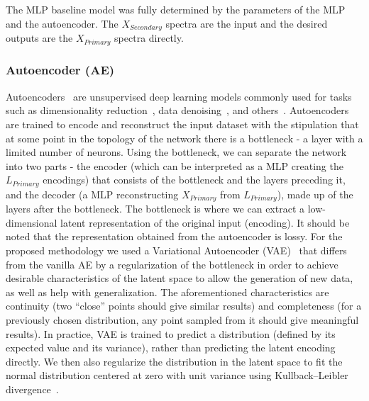 \documentclass[preprint,11pt]{elsarticle}
\begin{document}
The MLP baseline model was fully determined by the parameters of the MLP and the autoencoder. The $X_{Secondary}$ spectra are the input and the desired outputs are the $X_{Primary}$ spectra directly.



\subsubsection{Autoencoder (AE)}
\label{sec:ae}
\noindent
Autoencoders~\cite{kramer1991nonlinear} are unsupervised deep learning models commonly used for tasks such as dimensionality reduction~\cite{wang2014generalized}, data denoising~\cite{vincent2008extracting}, and others~\cite{bank2020autoencoders}. Autoencoders are trained to encode and reconstruct the input dataset with the stipulation that at some point in the topology of the network there is a bottleneck - a layer with a limited number of neurons. Using the bottleneck, we can separate the network into two parts - the encoder (which can be interpreted as a MLP creating the $L_{Primary}$ encodings) that consists of the bottleneck and the layers preceding it, and the decoder (a MLP reconstructing $X_{Primary}$ from ${L}_{Primary}$), made up of the layers after the bottleneck. The bottleneck is where we can extract a low-dimensional latent representation of the original input (encoding). It should be noted that the representation obtained from the autoencoder is lossy. For the proposed methodology we used a Variational Autoencoder (VAE)~\cite{VAE_welling} that differs from the vanilla AE by a regularization of the bottleneck in order to achieve desirable characteristics of the latent space to allow the generation of new data, as well as help with generalization. The aforementioned characteristics are continuity (two “close” points should give similar results) and completeness (for a previously chosen distribution, any point sampled from it should give meaningful results). In practice, VAE is trained to predict a distribution (defined by its expected value and its variance), rather than predicting the latent encoding directly. We then also regularize the distribution in the latent space to fit the normal distribution centered at zero with unit variance using Kullback–Leibler divergence~\cite{kingma2013auto}.
\end{document}
